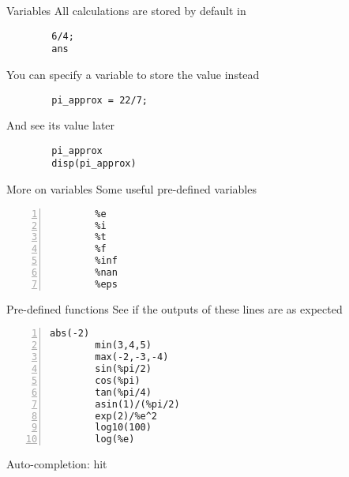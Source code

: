 \begin{frame}[fragile]{Variables}
    All calculations are stored by default in 
    \begin{lstlisting}
        6/4;
        ans
    \end{lstlisting}
    You can specify a variable to store the value instead
    \begin{lstlisting}
        pi_approx = 22/7;
    \end{lstlisting}
    And see its value later
    \begin{lstlisting}
        pi_approx
        disp(pi_approx)
    \end{lstlisting}
\end{frame}

\begin{frame}[fragile]{More on variables}
    Some useful pre-defined variables
    \begin{lstlisting}[numbers=left]
        %pi
        %e
        %i
        %t
        %f
        %inf
        %nan
        %eps
    \end{lstlisting}
\end{frame}

\begin{frame}[fragile]{Pre-defined functions}
    See if the outputs of these lines are as expected
    \begin{lstlisting}[numbers=left]
        abs(-2)
        min(3,4,5)
        max(-2,-3,-4)
        sin(%pi/2)
        cos(%pi)
        tan(%pi/4)
        asin(1)/(%pi/2)
        exp(2)/%e^2
        log10(100)
        log(%e)
    \end{lstlisting}
    Auto-completion: hit 
\end{frame}

